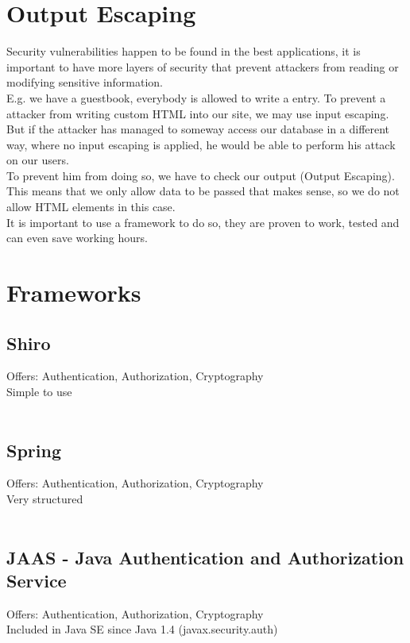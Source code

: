 \documentclass[12pt,a4paper]{report}
\begin{document}
\section{Output Escaping}
Security vulnerabilities happen to be found in the best applications, it is important to have more layers of security that prevent attackers from reading or modifying sensitive information.\\
E.g. we have a guestbook, everybody is allowed to write a entry. To prevent a attacker from writing custom HTML into our site, we may use input escaping. But if the attacker has managed to someway access our database in a different way, where no input escaping is applied, he would be able to perform his attack on our users.\\
To prevent him from doing so, we have to check our output (Output Escaping). This means that we only allow data to be passed that makes sense, so we do not allow HTML elements in this case.\\
It is important to use a framework to do so, they are proven to work, tested and can even save working hours.

\section{Frameworks}
\subsection{Shiro}
Offers: Authentication, Authorization, Cryptography\\
Simple to use\\\\

\subsection{Spring}
Offers: Authentication, Authorization, Cryptography\\
Very structured\\\\

\subsection{JAAS - Java Authentication and Authorization Service}
Offers: Authentication, Authorization, Cryptography\\
Included in Java SE since Java 1.4 (javax.security.auth)\\\\
\end{document}
